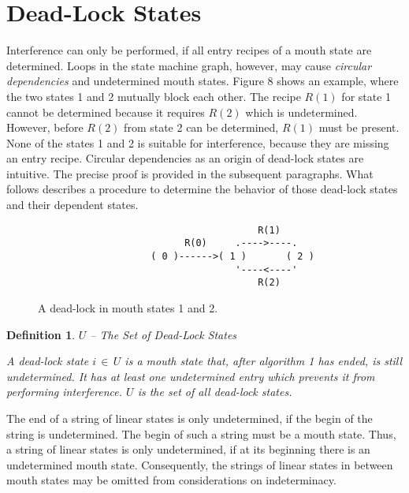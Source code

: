 \documentclass[12pt,a4paper]{scrartcl}
\newtheorem{definition}{Definition}
\begin{document}
\section{Dead-Lock States}

Interference can only be performed, if all entry recipes of a mouth state are
determined. Loops in the state machine graph, however, may cause
\textit{circular dependencies} and undetermined mouth states.  Figure 8 shows
an example, where the two states 1 and 2 mutually block each other. The recipe
$R(1)$ for state 1 cannot be determined because it requires $R(2)$ which is
undetermined. However, before $R(2)$ from state 2 can be determined, $R(1)$
must be present. None of the states 1 and 2 is suitable for interference,
because they are missing an entry recipe.  Circular dependencies as an origin
of dead-lock states are intuitive. The precise proof is provided in the
subsequent paragraphs. What follows describes a procedure to determine the
behavior of those dead-lock states and their dependent states.

\begin{figure}[htbp] \leavevmode
\begin{verbatim}
                                       R(1)
                          R(0)     .---->----.
                    ( 0 )------>( 1 )       ( 2 )
                                   '----<----'
                                       R(2)

\end{verbatim}
\caption{A dead-lock in mouth states 1 and 2.}
\end{figure}

\begin{definition} $U$ -- The Set of Dead-Lock States

A dead-lock state $i\,\in\,U$ is a mouth state that, after algorithm 1 has
ended, is still undetermined. It has at least one undetermined entry which
prevents it from performing interference. $U$ is the set of all dead-lock
states.

\end{definition}

The end of a string of linear states is only undetermined, if the begin of the
string is undetermined. The begin of such a string must be a mouth state. Thus,
a string of linear states is only undetermined, if at its beginning there is an
undetermined mouth state. Consequently, the strings of linear states in between
mouth states may be omitted from considerations on indeterminacy.
\end{document}
